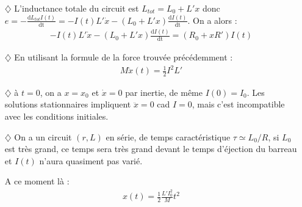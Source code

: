 \documentclass{report}
\begin{document}
\begin{itemize}

	\item[$\diamondsuit$] L'inductance totale du circuit est $L_{tot}=L_0+L'x$ donc $e=-\frac{\mathrm{d}L_{tot}I(t)}{\mathrm{dt}}=-I(t)L'\dot{x}-(L_0+L'x)\frac{\mathrm{d}I(t)}{\mathrm{dt}}$. On a alors :
	\begin{align*}
		-I(t)L'\dot{x}-(L_0+L'x)\frac{\mathrm{d}I(t)}{\mathrm{dt}} = (R_0+xR')I(t)
	\end{align*}
	
	\item[$\diamondsuit$] En utilisant la formule de la force trouvée précédemment :
	\begin{align*}
		M\ddot{x}(t)=\frac{1}{2}I^2L'
	\end{align*}
	
	\item[$\diamondsuit$] à $t=0$, on a $x=x_0$ et $\dot{x}=0$ par inertie, de même $I(0)=I_0$. Les solutions stationnaires impliquent $\ddot{x}=0$ cad $I=0$, mais c'est incompatible avec les conditions initiales. 
	
	\item[$\diamondsuit$] On a un circuit $(r,L)$ en série, de temps caractéristique $\tau\simeq L_0/R$, si $L_0$ est très grand, ce temps sera très grand devant le temps d'éjection du barreau et $I(t)$ n'aura quasiment pas varié. 
	
	A ce moment là :
	\begin{align*}		
		x(t)=\frac{1}{2}\frac{L'I_0^2}{M} t^2	
	\end{align*}

\end{itemize}
\end{document}
